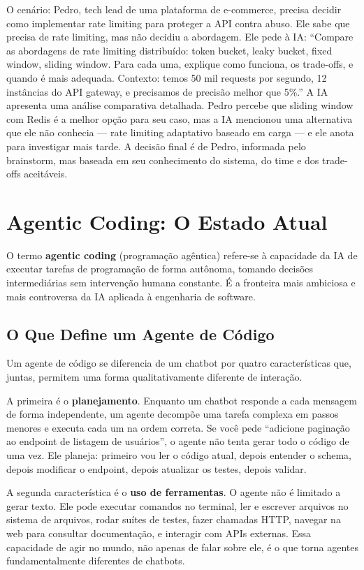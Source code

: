 O cenário: Pedro, tech lead de uma plataforma de e-commerce, precisa decidir como
implementar rate limiting para proteger a API contra abuso. Ele sabe que precisa de
rate limiting, mas não decidiu a abordagem. Ele pede à IA: ``Compare as abordagens
de rate limiting distribuído: token bucket, leaky bucket, fixed window, sliding window.
Para cada uma, explique como funciona, os trade-offs, e quando é mais adequada.
Contexto: temos 50 mil requests por segundo, 12 instâncias do API gateway, e
precisamos de precisão melhor que 5\%.'' A IA apresenta uma análise comparativa
detalhada. Pedro percebe que sliding window com Redis é a melhor opção para seu caso,
mas a IA mencionou uma alternativa que ele não conhecia --- rate limiting adaptativo
baseado em carga --- e ele anota para investigar mais tarde. A decisão final é de
Pedro, informada pelo brainstorm, mas baseada em seu conhecimento do sistema, do
time e dos trade-offs aceitáveis.

\section{Agentic Coding: O Estado Atual}

O termo \textbf{agentic coding} (programação agêntica) refere-se à
capacidade da IA de executar tarefas de programação de forma autônoma,
tomando decisões intermediárias sem intervenção humana constante. É a
fronteira mais ambiciosa e mais controversa da IA aplicada à engenharia
de software.

\subsection{O Que Define um Agente de Código}

Um agente de código se diferencia de um chatbot por quatro características
que, juntas, permitem uma forma qualitativamente diferente de
interação.

A primeira é o \textbf{planejamento}. Enquanto um chatbot responde a cada mensagem
de forma independente, um agente decompõe uma tarefa complexa em passos menores e
executa cada um na ordem correta. Se você pede ``adicione paginação ao endpoint de
listagem de usuários'', o agente não tenta gerar todo o código de uma vez. Ele
planeja: primeiro vou ler o código atual, depois entender o schema, depois modificar
o endpoint, depois atualizar os testes, depois validar.

A segunda característica é o \textbf{uso de ferramentas}. O agente não é limitado a
gerar texto. Ele pode executar comandos no terminal, ler e escrever arquivos no
sistema de arquivos, rodar suítes de testes, fazer chamadas HTTP, navegar na web para
consultar documentação, e interagir com APIs externas. Essa capacidade de agir no
mundo, não apenas de falar sobre ele, é o que torna agentes fundamentalmente diferentes
de chatbots.

